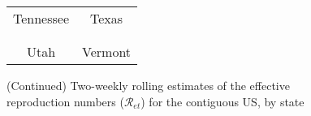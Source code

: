 \documentclass[12pt]{article}
\begin{document}
\begin{figure}[!p]%
\caption
{(Continued) Two-weekly rolling estimates of the effective reproduction numbers ($\mathcal
{R}_{et}$) for the contiguous US, by state}%
\vspace{-0.3cm}%


\begin{center}%
\hspace*{-0.2cm}%
\begin{tabular}
[c]{cc}%
{\footnotesize Tennessee} & {\footnotesize Texas}\\%
{\includegraphics[
height=1.7763in,
width=3.5293in
]%
{figs/US-Re-TN-2W.png}%
}
&
{\includegraphics[
height=1.7763in,
width=3.5293in
]%
{figs/US-Re-TX-2W.png}%
}
\\
& \\
{\footnotesize Utah} & {\footnotesize Vermont}\\%

\end{tabular}
\end{center}
\end{figure}
\end{document}
